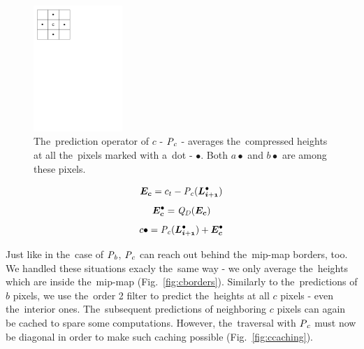 \begin{figure}
	\includegraphics[trim={0 21cm 10cm 0}, clip, width=0.3\textwidth]{figures/ccomp.pdf}\centering
	\caption{The~prediction operator of $c$ - $\mathit{P_{c}}$ - averages the~compressed heights at all the~pixels marked with a~dot - $\bullet$. Both $a\bullet$ and $b\bullet$ are among these pixels.}
	\label{fig:ccomp}
\end{figure}

$$\objnorm{E}{c} = c_t - \opnorm{P}{c}(\ldot{i+1})$$
$$\objdot{E}{c} = \opnorm{Q}{D}(\objnorm{E}{c})$$
\begin{equation}
\label{eq:c}
c\bullet = \opnorm{P}{c}(\ldot{i+1}) + \objdot{E}{c}
\end{equation}

Just like in the~case of $\mathit{P_{b}}$, $\mathit{P_{c}}$ can reach out behind the~mip-map borders, too. We handled these situations exacly the~same way - we only average the~heights which are inside the~mip-map (Fig.~\ref{fig:cborders}). Similarly to the~predictions of $b$ pixels, we use the~order 2 filter to predict the~heights at all $c$ pixels - even the~interior ones. The~subsequent predictions of neighboring $c$ pixels can again be cached to spare some computations. However, the~traversal with $\mathit{P_{c}}$ must now be diagonal in order to make such caching possible (Fig.~\ref{fig:ccaching}).

